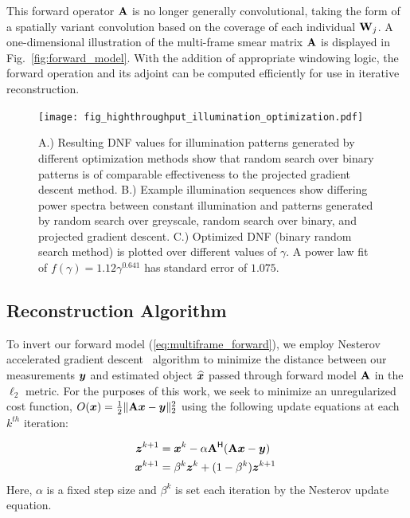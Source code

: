 This forward operator $\mathbf{A}$ is no longer generally convolutional, taking the form of a spatially variant convolution based on the coverage of each individual $\mathbf{W}_j$. A one-dimensional illustration of the multi-frame smear matrix $\mathbf{A}$ is displayed in Fig.~\ref{fig:forward_model}. 
With the addition of appropriate windowing logic, the forward operation and its adjoint can be computed efficiently for use in iterative reconstruction.

\begin{figure}
  \centering
    \texttt{[image: fig\_highthroughput\_illumination\_optimization.pdf]}

  \caption{ \label{fig:illum_optimization} A.) Resulting DNF values for illumination patterns generated by different optimization methods show that random search over binary patterns is of comparable effectiveness to the projected gradient descent method. B.) Example illumination sequences show differing power spectra between constant illumination and patterns generated by random search over greyscale, random search over binary, and projected gradient descent. C.) Optimized DNF (binary random search method) is plotted over different values of $\gamma$. A power law fit of $f(\gamma) = 1.12 \gamma^{0.641}$ has standard error of $1.075$.}
\end{figure}

\subsection{Reconstruction Algorithm}\label{sec:recon}
To invert our forward model (\eqref{eq:multiframe_forward}), we employ Nesterov accelerated gradient descent~\cite{nesterov} algorithm to minimize the distance between our measurements $\bm{y}$ and estimated object $\widehat {\bm{x}}$ passed through forward model $\mathbf{A}$ in the $\ell_2$ metric. For the purposes of this work, we seek to minimize an unregularized cost function, $O(\bm{x}) = \frac{1}{2}\|\mathbf{A}\bm{x} - \bm{y}\|_2^2$ using the following update equations at each $k^{th}$ iteration:

\begin{align}\label{eq:reconstruction}
\begin{split}
    \bm z^{k+1} &= \bm{x}^k - \alpha \mathbf{A}^{\mathsf{H}} (\mathbf{A}\bm{x} - \bm{y}) \\
    \bm{x}^{k+1} &= \beta^k \bm z^k + (1-\beta^k) \bm z^{k+1}\:    
\end{split}
\end{align}
Here, $\alpha$ is a fixed step size and $\beta^k$ is set each iteration by the Nesterov update equation.

